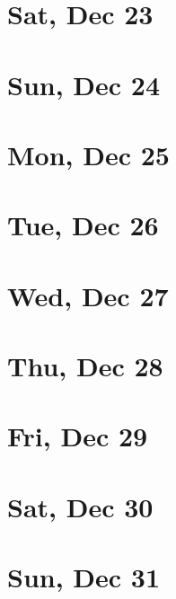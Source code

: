 	\section{Sat, Dec 23}
		
	\section{Sun, Dec 24}
		
	\section{Mon, Dec 25}
		
	\section{Tue, Dec 26}
		
	\section{Wed, Dec 27}
		
	\section{Thu, Dec 28}
		
	\section{Fri, Dec 29}
		
	\section{Sat, Dec 30}
		
	\section{Sun, Dec 31}
		
